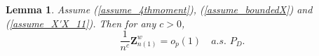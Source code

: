 \documentclass[ejs,authoryear,linksfromyear]{imsart}
\newcommand{\sumin}{\sum_{i=1}^n} %
\newcommand{\CONV}[1]{\stackrel{\text{#1}}{\longrightarrow}} %
\newcommand{\znwa}{\bm{Z}_{n(1)}^w}
\numberwithin{equation}{section}
\theoremstyle{plain}
\newtheorem{lem}{Lemma}[section]
\begin{document}

\begin{lem} \label{lem_Znw1}
	Assume (\ref{assume_4thmoment}), (\ref{assume_boundedX}) and (\ref{assume_X'X_11}). Then for any $c>0$,
	$$
	\dfrac{1}{n^c} \znwa
	= o_p(1) \quad a.s. \,\, P_D.
	$$
\end{lem}
\end{document}
